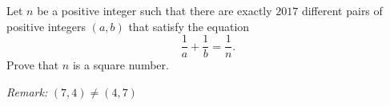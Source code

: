Let $n$ be a positive integer such that there are exactly $2017$ different pairs of positive
integers $(a,b)$ that satisfy the equation
\[
    \frac{1}{a} + \frac{1}{b} = \frac{1}{n}.
\]
Prove that $n$ is a square number.

\emph{Remark:} $(7,4) \neq (4,7)$
